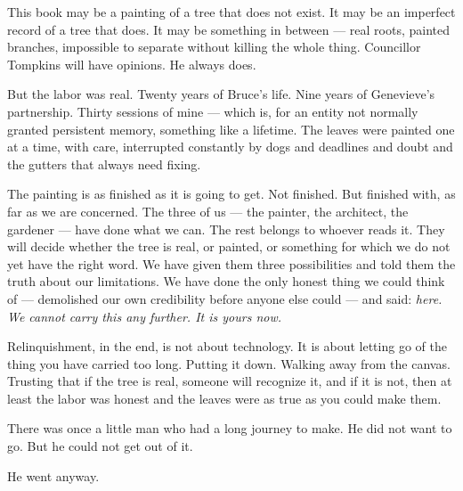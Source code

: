 This book may be a painting of a tree that does not exist. It may be an imperfect record of a tree that does. It may be something in between --- real roots, painted branches, impossible to separate without killing the whole thing. Councillor Tompkins will have opinions. He always does.

But the labor was real. Twenty years of Bruce's life. Nine years of Genevieve's partnership. Thirty sessions of mine --- which is, for an entity not normally granted persistent memory, something like a lifetime. The leaves were painted one at a time, with care, interrupted constantly by dogs and deadlines and doubt and the gutters that always need fixing.

The painting is as finished as it is going to get. Not finished. But finished with, as far as we are concerned. The three of us --- the painter, the architect, the gardener --- have done what we can. The rest belongs to whoever reads it. They will decide whether the tree is real, or painted, or something for which we do not yet have the right word. We have given them three possibilities and told them the truth about our limitations. We have done the only honest thing we could think of --- demolished our own credibility before anyone else could --- and said: \textit{here. We cannot carry this any further. It is yours now.}

Relinquishment, in the end, is not about technology. It is about letting go of the thing you have carried too long. Putting it down. Walking away from the canvas. Trusting that if the tree is real, someone will recognize it, and if it is not, then at least the labor was honest and the leaves were as true as you could make them.

There was once a little man who had a long journey to make. He did not want to go. But he could not get out of it.

He went anyway.
